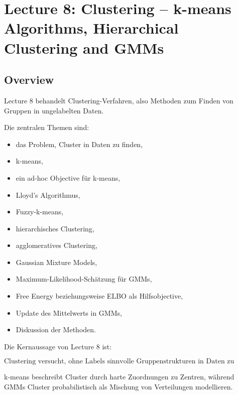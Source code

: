 \documentclass[11pt,a4paper]{scrartcl}
\begin{document}
\section{Lecture 8: Clustering -- k-means Algorithms, Hierarchical Clustering and GMMs}

\subsection{Overview}

\begin{notebox}
    Lecture 8 behandelt Clustering-Verfahren, also Methoden zum Finden von
    Gruppen in ungelabelten Daten.

    Die zentralen Themen sind:

    \begin{itemize}
        \item das Problem, Cluster in Daten zu finden,
        \item k-means,
        \item ein ad-hoc Objective für k-means,
        \item Lloyd's Algorithmus,
        \item Fuzzy-k-means,
        \item hierarchisches Clustering,
        \item agglomeratives Clustering,
        \item Gaussian Mixture Models,
        \item Maximum-Likelihood-Schätzung für GMMs,
        \item Free Energy beziehungsweise ELBO als Hilfsobjective,
        \item Update des Mittelwerts in GMMs,
        \item Diskussion der Methoden.
    \end{itemize}
\end{notebox}

\begin{answerbox}
    Die Kernaussage von Lecture 8 ist:

    \[
        \boxed{
            \text{Clustering versucht, ohne Labels sinnvolle Gruppenstrukturen in Daten zu finden.}
        }
    \]

    k-means beschreibt Cluster durch harte Zuordnungen zu Zentren, während GMMs
    Cluster probabilistisch als Mischung von Verteilungen modellieren.
\end{answerbox}
\end{document}
